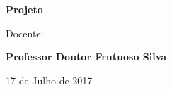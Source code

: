 \vspace{0.2cm}
\begin{center}
\begin{large}
\textbf{Projeto}\\
\end{large}
\end{center}

\vspace{0,4cm}
\begin{center}
\begin{normalsize}
\begin{large}
Docente:
\end{large}
\end{normalsize}
\end{center}

\vspace{0.2cm}
\begin{center}
\begin{large}
\textbf{Professor Doutor Frutuoso Silva}
\end{large}
\end{center}


\vspace{0.4cm}
\begin{center}
\begin{normalsize}
17 de Julho de 2017

\end{normalsize}
\end{center}
